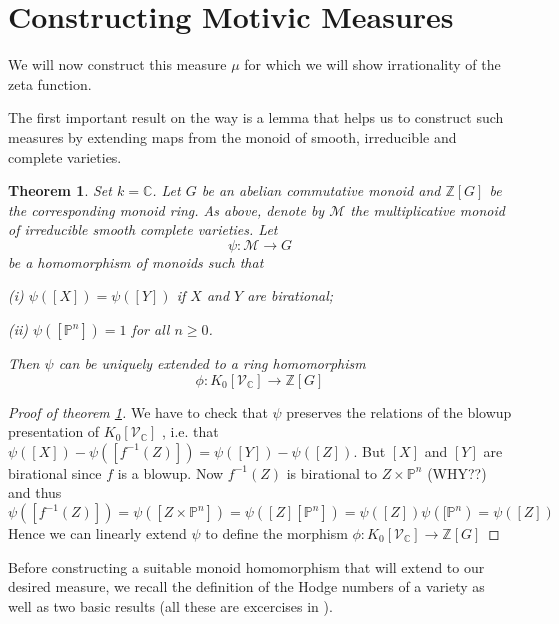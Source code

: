 \documentclass[11pt, a4paper, german]{article}
\theoremstyle{plain}
\newtheorem{theorem}{Theorem}
\theoremstyle{definition}
\newcommand{\gring}[1][k]{K_0[\mathcal{V}_#1]}
\begin{document}
\section{Constructing Motivic Measures}

We will now construct this measure $\mu$ for which we will show irrationality of the zeta function.

The first important result on the way is a lemma that helps us to construct such measures by extending maps from the monoid of smooth, irreducible
and complete varieties.

\begin{theorem}
    \label{th1}
    Set $k = \mathbb{C}$. Let $G$ be an abelian commutative monoid and $\mathbb{Z}[G]$ be the corresponding monoid ring. As above, denote
    by $\mathcal{M}$ the multiplicative monoid of irreducible smooth complete varieties. Let
    \[
        \psi: \mathcal{M} \to G
    \]
    be a homomorphism of monoids such that

    (i) $\psi([X]) = \psi([Y])$ if $X$ and $Y$ are birational;

    (ii) $\psi([\mathbb{P}^n]) = 1$ for all $n \ge 0$.

    Then $\psi$ can be uniquely extended to a ring homomorphism 
    \[
        \phi: \gring[\mathbb{C}] \to \mathbb{Z} [G]
    \]
\end{theorem}

\begin{proof}[Proof of theorem \ref{th1}]
    We have to check that $\psi$ preserves the relations of the blowup presentation of $\gring[\mathbb{C}]$
    , i.e. that $\psi([X]) - \psi([f^{-1}(Z)]) = \psi([Y]) - \psi([Z])$. 
    But $[X]$ and $[Y]$ are birational since $f$ is a blowup.
    Now $f^{-1}(Z)$ is birational to $Z \times \mathbb{P}^n$ (WHY??) and thus 
    \[
        \psi([f^{-1}(Z)]) = \psi([Z \times \mathbb{P}^n]) = \psi([Z][\mathbb{P}^n]) = \psi([Z])\psi([\mathbb{P}^n) = \psi([Z])
    \]
    Hence we can linearly extend $\psi$ to define the morphism $\phi: \gring[\mathbb{C}] \to \mathbb{Z} [G]$
\end{proof}

Before constructing a suitable monoid homomorphism that will extend to our desired measure, we recall the definition of the Hodge numbers
of a variety as well as two basic results (all these are excercises in \cite[Chapter II]{Ha}).
\end{document}
